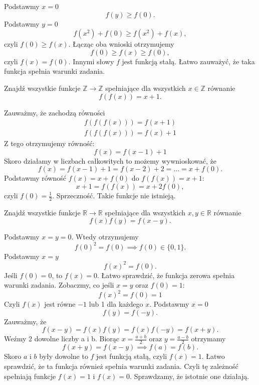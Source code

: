 \noindent
Podstawmy $x = 0$
\[ 
	f(y) \geqslant f(0). 
\] 
Podstawmy $y = 0$ 
\[ 
	f(x^2) + f(0) \geqslant f(x^2) + f(x), 
\] 
czyli $f(0) \geqslant f(x) $. 
Łącząc oba wnioski otrzymujemy
\[ 
	f(0) \geqslant f(x) \geqslant f(0), 
\] 
czyli $f(x) = f(0)$. Innymi słowy $f$ jest funkcją stałą. Łatwo zauważyć, że taka funkcja spełnia warunki zadania. 

\vspace{5px}

\begin{problem}{8}
	Znajdź wszystkie funkcje $\mathbb{Z} \rightarrow \mathbb{Z} $ spełniające dla wszystkich $x \in \mathbb{Z} $ równanie
	\[
		 f(f(x)) =x+1.
	\] 
\end{problem}


\noindent
Zauważmy, że zachodzą równości 
\begin{gather*} 
f(f(f(x))) = f(x + 1) \\
f(f(f(x))) = f(x) +1 
\end{gather*} 
Z tego otrzymujemy równość: 
\[
	f(x) =f(x-1)+1 
\] 
Skoro działamy w liczbach całkowitych to możemy wywnioskować, że
\[
	f(x) = f(x - 1) + 1 = f(x - 2) +  2 =  ... = x + f(0).
\] 
Podstawmy równość $f(x) = x + f(0)$ do 
$f(f(x)) = x + 1$:
\[
	x + 1 = f(f(x))= x + 2f(0), 
\]
czyli $f(0) = \frac{1}{2}$. Sprzeczność. Takie funkcje nie istnieją.

\vspace{5px} 

\begin{problem}{9}
	Znajdź wszystkie funkcje $\mathbb{R} \rightarrow \mathbb{R} $ spełniające dla wszystkich $x, y \in \mathbb{R} $ równanie 
	\[
		f(x) f(y) = f(x-y).
	\] 
\end{problem}


\noindent
Podstawmy $x = y = 0$. Wtedy otrzymujemy 
\[
	f(0)^{2} = f(0) \implies f(0) \in \{0, 1\}.
\]
Podstawmy $x = y$
\[
	f(x)^{2} = f(0).
\] 
Jeśli $f(0)=0$, to $f(x) =0$. Łatwo sprawdzić, że funkcja zerowa spełnia warunki zadania.
Zobaczmy, co jeśli $x = y$ oraz $f(0) = 1$:
\[
	f(x)^{2} = f(0) = 1 
\] 
Czyli $f(x)$ jest równe $-1$ lub 1 dla każdego $x$.
Podstawmy $x=0$
\[
	f(y) =f(-y).
\] 
Zauważmy, że 
\[
	f(x - y) = f(x)f(y) = f(x)f(-y) = f(x+y). 
\] 
Weźmy 2 dowolne liczby a i b. Biorąc $x=\frac{a+b}{2}$ oraz 
$y=\frac{a-b}{2}$ otrzymamy
\[
	f(x+y) = f(x-y) \implies f(a) = f(b).
\] 
Skoro $a$ i $b$ były dowolne to $f$ jest funkcją stałą, czyli $f(x) = 1$. Łatwo sprawdzić, że ta funkcja również spełnia warunki zadania. Czyli tę zależność spełniają funkcje $f(x) = 1 $ i $f(x) = 0$. Sprawdzamy, że istotnie one działają.


